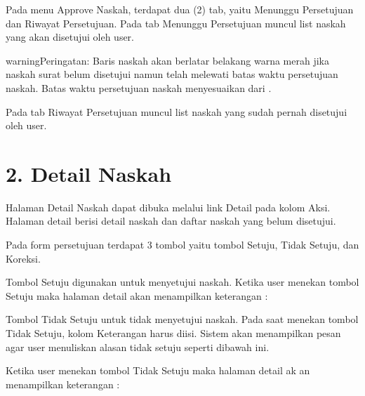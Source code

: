 \documentclass[letterpaper,10pt,bahasai]{sphinxmanual}
\begin{document}
Pada menu Approve Naskah, terdapat dua (2) tab, yaitu Menunggu Persetujuan dan Riwayat Persetujuan. Pada tab Menunggu
Persetujuan muncul list naskah yang akan disetujui oleh user.

\noindent{}

\begin{sphinxadmonition}{warning}{Peringatan:}
Baris naskah akan berlatar belakang warna merah jika naskah surat belum disetujui namun telah melewati batas waktu persetujuan naskah. Batas waktu persetujuan naskah menyesuaikan dari .
\end{sphinxadmonition}

\noindent{}

Pada tab Riwayat Persetujuan muncul list naskah yang sudah pernah disetujui oleh user.

\noindent{}


\section{2. Detail Naskah}
\label{\detokenize{ciptanaskah:detail-naskah}}
Halaman Detail Naskah dapat dibuka melalui link Detail pada kolom Aksi. Halaman detail berisi detail naskah dan
daftar naskah yang belum disetujui.

\noindent{}

Pada form persetujuan terdapat 3 tombol yaitu tombol Setuju, Tidak Setuju, dan Koreksi.

\begin{DUlineblock}{0em}
\item[]  Tombol Setuju digunakan untuk menyetujui naskah. Ketika user menekan tombol Setuju maka halaman detail akan menampilkan keterangan : 
\item[]  Tombol Tidak Setuju untuk tidak menyetujui naskah. Pada saat menekan tombol Tidak Setuju, kolom Keterangan harus diisi. Sistem akan menampilkan pesan agar user menuliskan alasan tidak setuju seperti dibawah ini.
\end{DUlineblock}

\noindent{}

Ketika user menekan tombol Tidak Setuju maka halaman detail ak an menampilkan keterangan :
\end{document}
